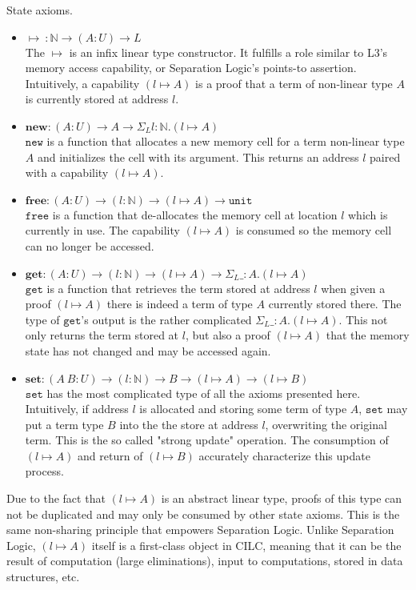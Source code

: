 \documentclass[sigplan,screen,review,anonymous]{acmart}
\newcommand{\unit}{\texttt{unit}}
\newcommand{\new}{\texttt{new}}
\newcommand{\free}{\texttt{free}}
\newcommand{\get}{\texttt{get}}
\newcommand{\set}{\texttt{set}}
\newcommand{\SigmaL}{\Sigma_{\scriptscriptstyle L}}
\begin{document}
\begin{definition}
  State axioms.
  \begin{itemize}
    \item $\mapsto\ : \mathbb{N} \rightarrow (A : U) \rightarrow L$ \\
          The $\mapsto$ is an infix linear type constructor. It fulfills a role similar to L3's \cite{l3} memory access capability, or Separation Logic's \cite{reynolds02} points-to assertion. Intuitively, a capability $(l \mapsto A)$ is a proof that a term of non-linear type $A$ is currently stored at address $l$.
    \item $\textbf{new} : (A : U) \rightarrow A \rightarrow \SigmaL l:\mathbb{N}.(l \mapsto A)$ \\
          $\new$ is a function that allocates a new memory cell for a term non-linear type $A$ and initializes the cell with its argument. This returns an address $l$ paired with a capability $(l \mapsto A)$.
    \item $\textbf{free} : (A : U) \rightarrow (l:\mathbb{N}) \rightarrow (l \mapsto A) \rightarrow \unit$ \\
          $\free$ is a function that de-allocates the memory cell at location $l$ which is currently in use. The capability $(l \mapsto A)$ is consumed so the memory cell can no longer be accessed.
    \item $\textbf{get} : (A : U) \rightarrow (l : \mathbb{N}) \rightarrow (l \mapsto A) \rightarrow \SigmaL \_: A. (l \mapsto A)$ \\
          $\get$ is a function that retrieves the term stored at address $l$ when given a proof $(l \mapsto A)$ there is indeed a term of type $A$ currently stored there. The type of $\get$'s output is the rather complicated $\SigmaL \_: A. (l \mapsto A)$. This not only returns the term stored at $l$, but also a proof $(l \mapsto A)$ that the memory state has not changed and may be accessed again.
    \item $\textbf{set} : (A\ B : U) \rightarrow (l : \mathbb{N}) \rightarrow B \rightarrow (l \mapsto A) \rightarrow (l \mapsto B)$ \\
          $\set$ has the most complicated type of all the axioms presented here. Intuitively, if address $l$ is allocated and storing some term of type $A$, $\set$ may put a term type $B$ into the the store at address $l$, overwriting the original term. This is the so called "strong update" operation. The consumption of $(l \mapsto A)$ and return of $(l \mapsto B)$ accurately characterize this update process.
  \end{itemize}
\end{definition}
Due to the fact that $(l \mapsto A)$ is an abstract linear type, proofs of this type can not be duplicated and may only be consumed by other state axioms. This is the same non-sharing principle that empowers Separation Logic. Unlike Separation Logic, $(l \mapsto A)$ itself is a first-class object in CILC, meaning that it can be the result of computation (large eliminations), input to computations, stored in data structures, etc.
\end{document}
